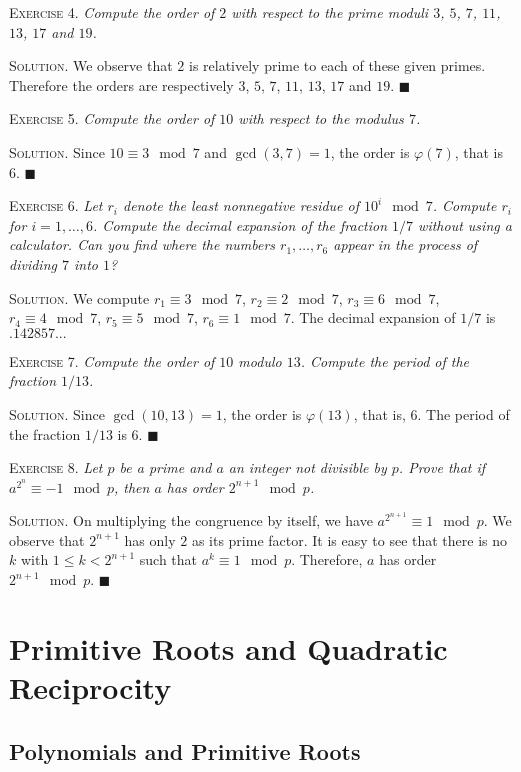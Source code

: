 \documentclass[11pt, leqno]{article}
\newcommand{\done}{\ensuremath{\blacksquare}}
\begin{document}
\textsc{Exercise 4}. \emph{Compute the order of $2$ with respect to the prime moduli $3$, $5$, $7$, $11$, $13$, $17$ and $19$.}

\textsc{Solution}. We observe that $2$ is relatively prime to each of these given primes. Therefore the orders are respectively $3$, $5$, $7$, $11$, $13$, $17$ and $19$. \done

\textsc{Exercise 5}. \emph{Compute the order of $10$ with respect to the modulus $7$.}

\textsc{Solution}. Since $10 \equiv 3 \mod 7$ and $\gcd(3,7) = 1$, the order is $\varphi(7)$, that is $6$. \done

\textsc{Exercise 6}. \emph{Let $r_i$ denote the least nonnegative residue of $10^i \mod 7$. Compute $r_i$ for $i=1,\ldots,6$. Compute the decimal expansion of the fraction $1/7$ without using a calculator. Can you find where the numbers $r_1, \ldots, r_6$ appear in the process of dividing $7$ into $1$?}

\textsc{Solution}. We compute $r_1 \equiv 3 \mod 7$, $r_2 \equiv 2 \mod 7$, $r_3 \equiv 6 \mod 7$, $r_4 \equiv 4 \mod 7$, $r_5 \equiv 5 \mod 7$, $r_6 \equiv 1 \mod 7$. The decimal expansion of $1/7$ is $.142857...$

\textsc{Exercise 7}. \emph{Compute the order of $10$ modulo $13$. Compute the period of the fraction $1/13$.}

\textsc{Solution}. Since $\gcd(10,13)=1$, the order is $\varphi(13)$, that is, 6. The period of the fraction $1/13$ is 6. \done

\textsc{Exercise 8}. \emph{Let $p$ be a prime and $a$ an integer not divisible by $p$. Prove that if $a^{2^n}\equiv -1 \mod p$, then $a$ has order $2^{n+1} \mod p$.}

\textsc{Solution}. On multiplying the congruence by itself, we have $a^{2^{n+1}} \equiv 1 \mod p$. We observe that $2^{n+1}$ has only $2$ as its prime factor. It is easy to see that there is no $k$ with $1\leq k < 2^{n+1}$ such that $a^k \equiv 1 \mod p$. Therefore, $a$ has order $2^{n+1}\mod p$. \done

\section{Primitive Roots and Quadratic Reciprocity}

\subsection{Polynomials and Primitive Roots}
\end{document}
